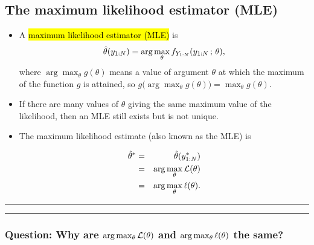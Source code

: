 \documentclass[]{article}
\begin{document}
\subsection{The maximum likelihood estimator
(MLE)}\label{the-maximum-likelihood-estimator-mle}

\begin{itemize}
\item
  A \hl{maximum likelihood estimator (MLE)} is
  \[ \hat\theta(y_{1:N}) = \arg\max_\theta f_{Y_{1:N}}(y_{1:N}\, ; \,\theta),\]
  where \(\arg\max_\theta g(\theta)\) means a value of argument
  \(\theta\) at which the maximum of the function \(g\) is attained, so
  \(g\big(\arg\max_\theta g(\theta)\big) = \max_\theta g(\theta)\).
\item
  If there are many values of \(\theta\) giving the same maximum value
  of the likelihood, then an MLE still exists but is not unique.
\item
  The maximum likelihood estimate (also known as the MLE) is

  \begin{eqnarray} \hat\theta^* &=& \hat\theta(y_{1:N}^*)
  \\
  &=& \arg\max_\theta \mathcal{L}(\theta)
  \\
  &=& \arg\max_\theta \ell(\theta).
  \end{eqnarray}
\end{itemize}

\begin{center}\rule{0.5\linewidth}{\linethickness}\end{center}

\begin{center}\rule{0.5\linewidth}{\linethickness}\end{center}

\subsubsection{\texorpdfstring{Question: Why are
\(\arg\max_\theta \mathcal{L}(\theta)\) and \(\arg\max_\theta \ell(\theta)\)
the
same?}{Question: Why are \textbackslash{}arg\textbackslash{}max\_\textbackslash{}theta \textbackslash{}lik(\textbackslash{}theta) and \textbackslash{}arg\textbackslash{}max\_\textbackslash{}theta \textbackslash{}loglik(\textbackslash{}theta) the same?}}\label{question-why-are-argmax_theta-liktheta-and-argmax_theta-logliktheta-the-same}

\end{document}
